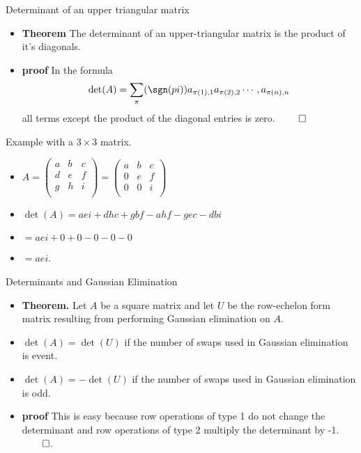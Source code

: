 \documentclass{beamer}
\begin{document}
\begin{frame}{Determinant of an upper triangular matrix}

\begin{itemize}
\item \textbf{Theorem} The determinant of an upper-triangular matrix
is the product of it's diagonals.
\item \textbf{proof} In the formula
$$
\det(A) = \sum_{\pi} (\sgn(pi)) a_{\pi(1),1} a_{\pi(2), 2} \cdots, a_{\pi(n), n}
$$
all terms except the product of the diagonal entries is zero. $\qed$
\end{itemize}
\end{frame}


\begin{frame}{Example with a $3\times 3$ matrix.}

\begin{itemize}
\item
$
A=
\begin{pmatrix}
a & b & c\\
d & e & f \\
g & h & i \\
\end{pmatrix}
=
\begin{pmatrix}
a & b & c\\
0 & e & f \\
0 & 0 & i \\
\end{pmatrix}
$
\item
$\det(A) = aei + dhc + gbf - ahf - gec - dbi$
\item
$= aei + 0 + 0 - 0 - 0 -0$
\item $=aei$.
\end{itemize}
\end{frame}


\begin{frame}{Determinants and Gaussian Elimination}
\begin{itemize}
\item \textbf{Theorem.} Let $A$ be a square matrix and let $U$ be
the row-echelon form matrix resulting from performing Gaussian elimination
on $A$.
\item $\det(A) = \det(U)$ if the number of swaps used in Gaussian elimination
is event.
\item $\det(A) = -\det(U)$ if the number of swaps used in Gaussian elimination is odd.
\item \textbf{proof} This is easy because row operations of type 1 do not
change the determinant and row operations of type 2 multiply the determinant by -1. $\qed$.
\end{itemize}
\end{frame}
\end{document}
